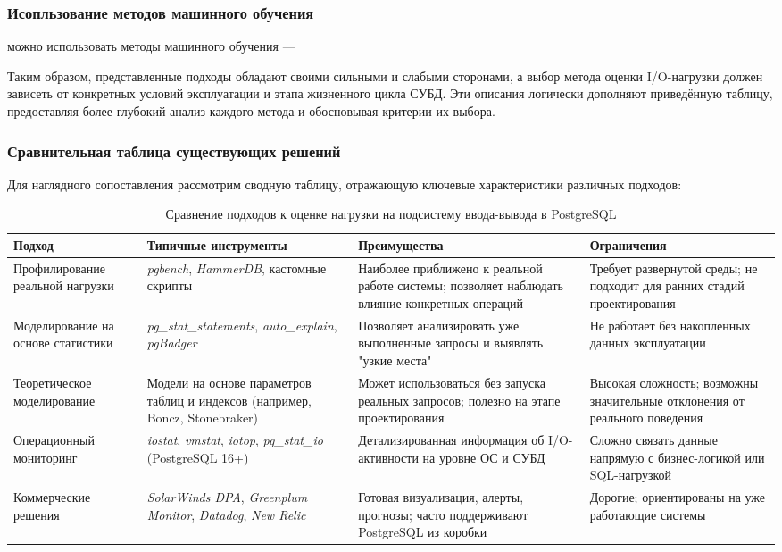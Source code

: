 \subsubsection{Исопльзование методов машинного обучения}
можно использовать методы машинного обучения \cite{zaghloul2024correction}
---

Таким образом, представленные подходы обладают своими сильными и слабыми сторонами, а выбор метода оценки I/O-нагрузки должен зависеть от конкретных условий эксплуатации и этапа жизненного цикла СУБД. Эти описания логически дополняют приведённую таблицу, предоставляя более глубокий анализ каждого метода и обосновывая критерии их выбора.


\subsubsection{Сравнительная таблица существующих решений}

Для наглядного сопоставления рассмотрим сводную таблицу, отражающую ключевые характеристики различных подходов:

\begin{table}[H]
\centering
\small
\begin{tabularx}{\textwidth}{@{}p{3.5cm}X>{\raggedright\arraybackslash}p{4.2cm}>{\raggedright\arraybackslash}p{3.5cm}@{}}
\toprule
\textbf{Подход} & \textbf{Типичные инструменты} & \textbf{Преимущества} & \textbf{Ограничения} \\
\midrule
Профилирование реальной нагрузки & \textit{pgbench}, \textit{HammerDB}, кастомные скрипты & Наиболее приближено к реальной работе системы; позволяет наблюдать влияние конкретных операций & Требует развернутой среды; не подходит для ранних стадий проектирования \\
\addlinespace
Моделирование на основе статистики & \textit{pg\_stat\_statements}, \textit{auto\_explain}, \textit{pgBadger} & Позволяет анализировать уже выполненные запросы и выявлять "узкие места" & Не работает без накопленных данных эксплуатации \\
\addlinespace
Теоретическое моделирование & Модели на основе параметров таблиц и индексов (например, Boncz, Stonebraker) & Может использоваться без запуска реальных запросов; полезно на этапе проектирования & Высокая сложность; возможны значительные отклонения от реального поведения \\
\addlinespace
Операционный мониторинг & \textit{iostat}, \textit{vmstat}, \textit{iotop}, \textit{pg\_stat\_io} (PostgreSQL 16+) & Детализированная информация об I/O-активности на уровне ОС и СУБД & Сложно связать данные напрямую с бизнес-логикой или SQL-нагрузкой \\
\addlinespace
Коммерческие решения & \textit{SolarWinds DPA}, \textit{Greenplum Monitor}, \textit{Datadog}, \textit{New Relic} & Готовая визуализация, алерты, прогнозы; часто поддерживают PostgreSQL из коробки & Дорогие; ориентированы на уже работающие системы \\
\bottomrule
\end{tabularx}
\caption{Сравнение подходов к оценке нагрузки на подсистему ввода-вывода в PostgreSQL}
\label{tab:io_approaches}
\end{table}


